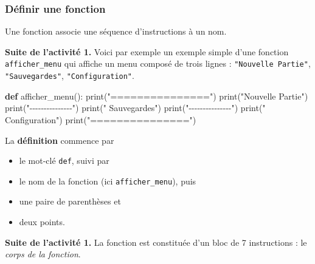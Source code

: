 \documentclass[a4paper,17pt]{extarticle}
\providecommand{\tightlist}{%
      \setlength{\itemsep}{0pt}\setlength{\parskip}{0pt}}
\newenvironment{Shaded}{}{}
\newcommand{\KeywordTok}[1]{\textcolor[rgb]{0.00,0.44,0.13}{\textbf{{#1}}}}
\newcommand{\StringTok}[1]{\textcolor[rgb]{0.25,0.44,0.63}{{#1}}}
\newcommand{\NormalTok}[1]{{#1}}
\newcommand{\BuiltInTok}[1]{{#1}}
\begin{document}
    \hypertarget{duxe9finir-une-fonction}{%
\subsubsection{Définir une fonction}\label{duxe9finir-une-fonction}}

    Une fonction associe une séquence d'instructions à un nom.
\begin{exemple}
    \textbf{Suite de l'activité 1.} Voici par exemple un exemple simple
d'une fonction \texttt{afficher\_menu} qui affiche un menu composé de
trois lignes : \texttt{"Nouvelle\ Partie"}, \texttt{"Sauvegardes"},
\texttt{"Configuration"}.

\begin{Shaded}
\begin{Highlighting}[]
\KeywordTok{def}\NormalTok{ afficher\_menu():}
    \BuiltInTok{print}\NormalTok{(}\StringTok{"==============="}\NormalTok{)}
    \BuiltInTok{print}\NormalTok{(}\StringTok{"Nouvelle Partie"}\NormalTok{)}
    \BuiltInTok{print}\NormalTok{(}\StringTok{"{-}{-}{-}{-}{-}{-}{-}{-}{-}{-}{-}{-}{-}{-}{-}"}\NormalTok{)}
    \BuiltInTok{print}\NormalTok{(}\StringTok{"  Sauvegardes"}\NormalTok{)}
    \BuiltInTok{print}\NormalTok{(}\StringTok{"{-}{-}{-}{-}{-}{-}{-}{-}{-}{-}{-}{-}{-}{-}{-}"}\NormalTok{)}
    \BuiltInTok{print}\NormalTok{(}\StringTok{" Configuration"}\NormalTok{)}
    \BuiltInTok{print}\NormalTok{(}\StringTok{"==============="}\NormalTok{)}
\end{Highlighting}
\end{Shaded}

        \end{exemple}\begin{retenir}
    La \textbf{définition} commence par

\begin{itemize}
\tightlist
\item
  le mot-clé \texttt{def}, suivi par
\item
  le nom de la fonction (ici \texttt{afficher\_menu}), puis
\item
  une paire de parenthèses et
\item
  deux points.
\end{itemize}

        \end{retenir}\begin{exemple}
    \textbf{Suite de l'activité 1.} La fonction est constituée d'un bloc de
7 instructions : le \emph{corps de la fonction}.


\end{exemple}
\end{document}
